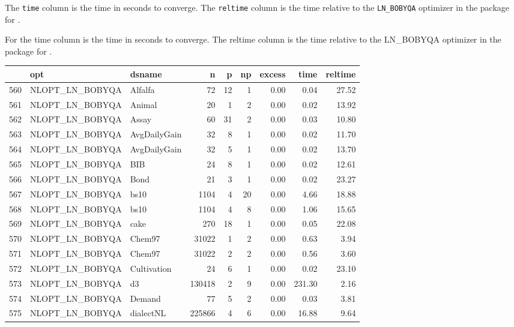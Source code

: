 \documentclass[article]{jss}
\begin{document}
The \texttt{time} column is the time in seconds to converge. The
\texttt{reltime} column is the time relative to the \texttt{LN\_BOBYQA}
optimizer in the  package for .

For  the time column is the time in seconds to converge. The reltime column is the time relative to the LN_BOBYQA optimizer in the  package for .



\begin{table}[htbp]
\centering
\begin{tabular}{rllrrrrrr}
  \hline
 & opt & dsname & n & p & np & excess & time & reltime \\ 
  \hline
560 & NLOPT\_LN\_BOBYQA & Alfalfa &  72 &  12 &   1 & 0.00 & 0.04 & 27.52 \\ 
  561 & NLOPT\_LN\_BOBYQA & Animal &  20 &   1 &   2 & 0.00 & 0.02 & 13.92 \\ 
  562 & NLOPT\_LN\_BOBYQA & Assay &  60 &  31 &   2 & 0.00 & 0.03 & 10.80 \\ 
  563 & NLOPT\_LN\_BOBYQA & AvgDailyGain &  32 &   8 &   1 & 0.00 & 0.02 & 11.70 \\ 
  564 & NLOPT\_LN\_BOBYQA & AvgDailyGain &  32 &   5 &   1 & 0.00 & 0.02 & 13.70 \\ 
  565 & NLOPT\_LN\_BOBYQA & BIB &  24 &   8 &   1 & 0.00 & 0.02 & 12.61 \\ 
  566 & NLOPT\_LN\_BOBYQA & Bond &  21 &   3 &   1 & 0.00 & 0.02 & 23.27 \\ 
  567 & NLOPT\_LN\_BOBYQA & bs10 & 1104 &   4 &  20 & 0.00 & 4.66 & 18.88 \\ 
  568 & NLOPT\_LN\_BOBYQA & bs10 & 1104 &   4 &   8 & 0.00 & 1.06 & 15.65 \\ 
  569 & NLOPT\_LN\_BOBYQA & cake & 270 &  18 &   1 & 0.00 & 0.05 & 22.08 \\ 
  570 & NLOPT\_LN\_BOBYQA & Chem97 & 31022 &   1 &   2 & 0.00 & 0.63 & 3.94 \\ 
  571 & NLOPT\_LN\_BOBYQA & Chem97 & 31022 &   2 &   2 & 0.00 & 0.56 & 3.60 \\ 
  572 & NLOPT\_LN\_BOBYQA & Cultivation &  24 &   6 &   1 & 0.00 & 0.02 & 23.10 \\ 
  573 & NLOPT\_LN\_BOBYQA & d3 & 130418 &   2 &   9 & 0.00 & 231.30 & 2.16 \\ 
  574 & NLOPT\_LN\_BOBYQA & Demand &  77 &   5 &   2 & 0.00 & 0.03 & 3.81 \\ 
  575 & NLOPT\_LN\_BOBYQA & dialectNL & 225866 &   4 &   6 & 0.00 & 16.88 & 9.64 \\ 

\end{tabular}
\end{table}
\end{document}
